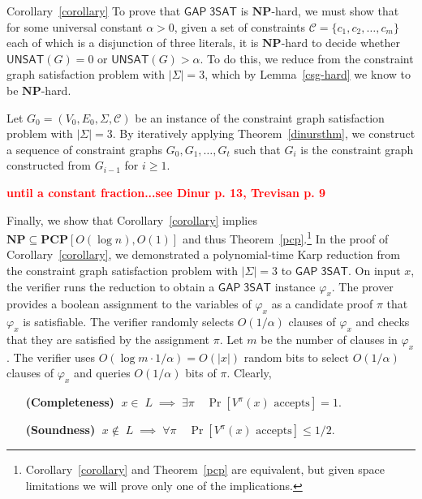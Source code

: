 \documentclass{article}
\newcommand{\fixme}[1] { \textcolor{red} {
{\fbox{ {\bf Fix:} \ensuremath{\blacktriangleright }} {\bf #1}
\fbox{\ensuremath{\blacktriangleleft} } } } }
\newenvironment{proof_of}[1]{\noindent {\bf Proof of #1:}
	\hspace*{1mm}}{\hspace*{\fill} $\Box$ }
\newcommand{\bits}{\{0,1\}}
\newcommand{\class}[1]{\mathbf{#1}}
\newcommand{\NP}{\class{NP}}
\newcommand{\PCP}{\class{PCP}}
\newcommand{\UNSAT}{\mathsf{UNSAT}}
\newcommand{\GAPSAT}{\mathsf{GAP\;3SAT}}
\begin{document}
\begin{proof_of}{Corollary~\ref{corollary}}
To prove that $\GAPSAT$ is $\NP$-hard, we must show that for some universal
constant $\alpha > 0$, given a set of constraints $\mathcal{C} = \{c_1, c_2, \dots, c_m\}$
each of which is a disjunction of three literals, it is $\NP$-hard to decide
whether $\UNSAT(G)=0$ or $\UNSAT(G)>\alpha$.
To do this, we reduce from the constraint graph satisfaction problem with
$|\Sigma| = 3$, which by Lemma~\ref{csg-hard} we know to be $\NP$-hard.

Let $G_0 = (V_0, E_0, \Sigma, \mathcal{C})$ be an instance of the constraint
graph satisfaction problem with $|\Sigma| = 3$.
By iteratively applying Theorem~\ref{dinursthm}, we construct a sequence
of constraint graphs $G_0, G_1, \dots, G_t$ such that $G_i$ is the constraint
graph constructed from $G_{i-1}$ for $i\ge 1$.

\fixme{until a constant fraction...see Dinur p. 13, Trevisan p. 9}
\end{proof_of}

Finally, we show that Corollary~\ref{corollary} implies $\NP \subseteq \PCP[O(\log n),O(1)]$
and thus Theorem~\ref{pcp}.\footnote{
Corollary~\ref{corollary} and Theorem~\ref{pcp} are equivalent, but given space limitations
we will prove only one of the implications.}
In the proof of Corollary~\ref{corollary}, we demonstrated a polynomial-time
Karp reduction from the constraint graph satisfaction problem with
$|\Sigma| = 3$ to $\GAPSAT$.
On input $x$, the verifier runs the reduction  to obtain a $\GAPSAT$
instance $\varphi_x$.
The prover provides %
a boolean assignment to the variables of $\varphi_x$ as a candidate proof $\pi$
that $\varphi_x$ is satisfiable.
The verifier randomly selects $O(1/\alpha)$ clauses of $\varphi_x$ and
checks that they are satisfied by the assignment $\pi$.
Let $m$ be the number of clauses in $\varphi_x$.
The verifier uses $O(\log m \cdot 1/\alpha) = O(|x|)$ random bits
to select $O(1/\alpha)$ clauses of $\varphi_x$ and queries
$O(1/\alpha)$ bits of $\pi$.
Clearly,
\begin{itemize}[leftmargin=10em]
\item[\textbf{(Completeness)}] $\;x \in\; L \;\implies\; \exists \pi \quad \Pr[V^\pi(x) \text{ accepts}] = 1$.
\item[\textbf{(Soundness)}] $\;x \notin\; L \;\implies\; \forall \pi \quad \Pr[V^\pi(x) \text{ accepts}] \le 1/2$.
\end{itemize}
\end{document}
